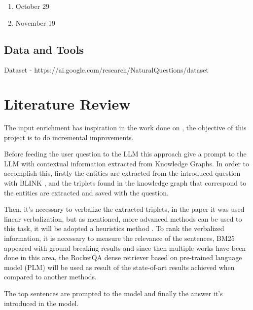 \documentclass{article}
\begin{document}
\begin{enumerate}
	\item October 29
	\item November 19
\end{enumerate}

\subsection{Data and Tools}

Dataset - https://ai.google.com/research/NaturalQuestions/dataset

\section{Literature Review}

The input enrichment has inspiration in the work done on \cite{baek2023knowledgeaugmentedlanguagemodelprompting}, the objective of this project is to do incremental improvements.

Before feeding the user question to the LLM this approach give a prompt to the LLM with contextual information extracted from Knowledge Graphs. In order to accomplish this, firstly the entities are extracted from the introduced question with BLINK \cite{wu2019zero}, and the triplets found in the knowledge graph that correspond to the entities are extracted and saved with the question.

Then, it's necessary to verbalize the extracted triplets, in the paper it was used linear verbalization, but as mentioned, more advanced methods can be used to this task, it will be adopted a heuristics method \cite{oguz-etal-2022-unik}. To rank the verbalized information, it is necessary to measure the relevance of the sentences, BM25 \cite{INR-019} appeared with ground breaking results and since then multiple works have been done in this area, the RocketQA \cite{ren-etal-2021-rocketqav2} dense retriever based on pre-trained language model (PLM) will be used as result of the state-of-art results achieved when compared to another methods.

The top sentences are prompted to the model and finally the answer it's introduced in the model. 

\printbibliography
\end{document}
